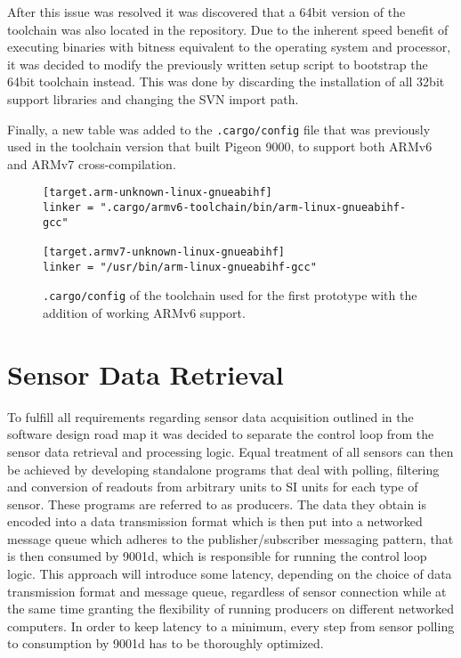 After this issue was resolved it was discovered that a 64bit version of the toolchain was also located in the repository. Due to the inherent speed benefit of executing binaries with bitness equivalent to the operating system and processor, it was decided to modify the previously written setup script to bootstrap the 64bit toolchain instead. This was done by discarding the installation of all 32bit support libraries and changing the SVN import path.

Finally, a new table was added to the \texttt{.cargo/config} file that was previously used in the toolchain version that built Pigeon 9000, to support both ARMv6 and ARMv7 cross-compilation.

\begin{figure}[H]
\begin{verbatim}
[target.arm-unknown-linux-gnueabihf]
linker = ".cargo/armv6-toolchain/bin/arm-linux-gnueabihf-gcc"

[target.armv7-unknown-linux-gnueabihf]
linker = "/usr/bin/arm-linux-gnueabihf-gcc"
\end{verbatim}
\caption{\texttt{.cargo/config} of the toolchain used for the first prototype with the addition of working ARMv6 support.}
\end{figure}

\section{Sensor Data Retrieval}
\author{Philip Trauner}

To fulfill all requirements regarding sensor data acquisition outlined in the software design road map it was decided to separate the control loop from the sensor data retrieval and processing logic.
Equal treatment of all sensors can then be achieved by developing standalone programs that deal with polling, filtering and conversion of readouts from arbitrary units to SI units for each type of sensor. These programs are referred to as producers. The data they obtain is encoded into a data transmission format which is then put into a networked message queue which adheres to the publisher/subscriber messaging pattern, that is then consumed by 9001d, which is responsible for running the control loop logic.
This approach will introduce some latency, depending on the choice of data transmission format and message queue, regardless of sensor connection while at the same time granting the flexibility of running producers on different networked computers. In order to keep latency to a minimum, every step from sensor polling to consumption by 9001d has to be thoroughly optimized.

